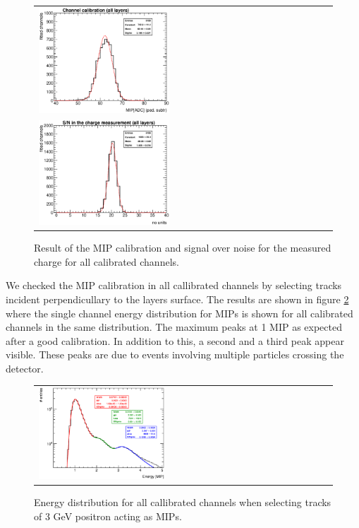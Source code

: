 \documentclass[final,3p,times,twocolumn]{elsarticle}
\begin{document}
\begin{figure}[!t]
  \centering
  \begin{tabular}{l}
    \includegraphics[width=0.45\textwidth]{../figs/MIP/MIPsummary_title.eps} \\
    \includegraphics[width=0.45\textwidth]{../figs/MIP/SNsummary_title.eps}  
  \end{tabular}
\caption{Result of the MIP calibration and signal over noise for the measured charge for all calibrated channels.}
\label{mipandSN}
\end{figure}

We checked the MIP 
calibration in all callibrated channels by selecting tracks
incident perpendicullary to the layers surface.
The results are shown in figure \ref{mip3peaks} where the single channel energy 
distribution for MIPs is shown for all calibrated channels in the same distribution. 
The maximum peaks at 1 MIP as expected after a good calibration.
In addition to this, a second and a third peak
appear visible. These peaks are due to
events involving multiple 
particles crossing the detector.

\begin{figure}[!t]
  \centering 
    \begin{tabular}{ll}
      \includegraphics[width=0.45\textwidth]{../figs/MIP/MIP3peaks.eps} 
    \end{tabular}
    \caption{Energy distribution for all callibrated channels when selecting tracks of 3 GeV positron acting as MIPs.}
\label{mip3peaks}
\end{figure}
\end{document}
